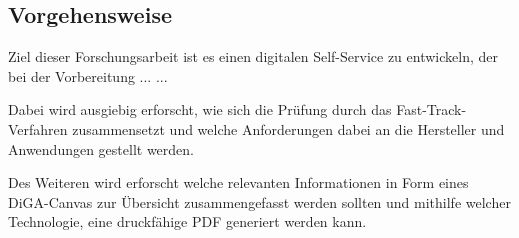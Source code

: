 \subsection{Vorgehensweise}
Ziel dieser Forschungsarbeit ist es einen digitalen Self-Service zu entwickeln, der bei der Vorbereitung
... ...

Dabei wird ausgiebig erforscht, wie sich die Prüfung durch das Fast-Track-Verfahren zusammensetzt und welche Anforderungen dabei an die Hersteller und Anwendungen gestellt werden.

Des Weiteren wird erforscht welche relevanten Informationen in Form eines DiGA-Canvas zur Übersicht zusammengefasst werden sollten und mithilfe welcher Technologie, eine druckfähige PDF generiert werden kann.